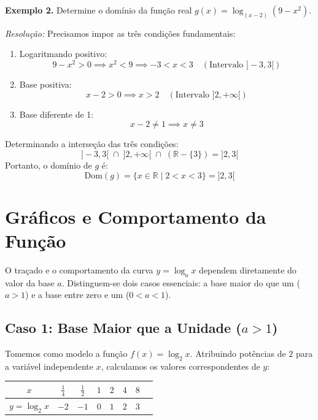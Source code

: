 \documentclass[12pt,a4paper]{report}
\begin{document}
	\vspace{0.3cm}
	
	\textbf{Exemplo 2.} Determine o domínio da função real $g(x) = \log_{(x - 2)} (9 - x^2)$.
	
	\textit{Resolução:}  
	Precisamos impor as três condições fundamentais:
	\begin{enumerate}[label=\textbf{\arabic*.}]
		\item Logaritmando positivo:
		$$9 - x^2 > 0 \implies x^2 < 9 \implies -3 < x < 3 \quad (\text{Intervalo } {]-3, 3[})$$
		\item Base positiva:
		$$x - 2 > 0 \implies x > 2 \quad (\text{Intervalo } {]2, +\infty[})$$
		\item Base diferente de 1:
		$$x - 2 \neq 1 \implies x \neq 3$$
	\end{enumerate}
	
	Determinando a interseção das três condições:
	$${]-3, 3[} \;\cap\; {]2, +\infty[} \;\cap\; (\mathbb{R} - \{3\}) = {]2, 3[}$$
	Portanto, o domínio de $g$ é:
	$$\text{Dom}(g) = \{x \in \mathbb{R} \mid 2 < x < 3\} = {]2, 3[}$$
	
	\section{Gráficos e Comportamento da Função}
	
	O traçado e o comportamento da curva $y = \log_a x$ dependem diretamente do valor da base $a$. Distinguem-se dois casos essenciais: a base maior do que um ($a > 1$) e a base entre zero e um ($0 < a < 1$).
	
	\subsection{Caso 1: Base Maior que a Unidade ($a > 1$)}
	
	Tomemos como modelo a função $f(x) = \log_2 x$. Atribuindo potências de $2$ para a variável independente $x$, calculamos os valores correspondentes de $y$:
	
	\begin{center}
		\begin{tabular}{|c|c|c|c|c|c|c|c|}
			\hline
			$x$ & $\frac{1}{4}$ & $\frac{1}{2}$ & $1$ & $2$ & $4$ & $8$ \\
			\hline
			$y = \log_2 x$ & $-2$ & $-1$ & $0$ & $1$ & $2$ & $3$ \\
			\hline
		\end{tabular}
	\end{center}
	
\end{document}
